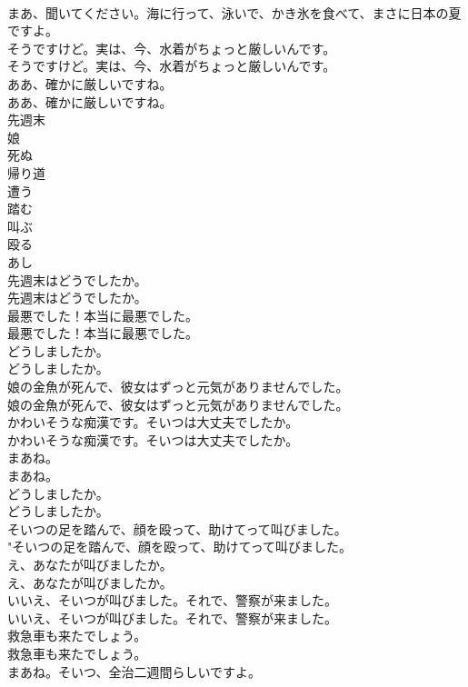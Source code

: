 \documentclass[8pt]{extreport}
\begin{document}
\begin{CJK}{UTF8}{min}
\\	まあ、聞いてください。海に行って、泳いで、かき氷を食べて、まさに日本の夏ですよ。 
\\	そうですけど。実は、今、水着がちょっと厳しいんです。	
\\	そうですけど。実は、今、水着がちょっと厳しいんです。 
\\	ああ、確かに厳しいですね。	
\\	ああ、確かに厳しいですね。 
\\	先週末
\\	娘
\\	死ぬ
\\	帰り道
\\	遭う
\\	踏む
\\	叫ぶ
\\	殴る
\\	あし
\\	先週末はどうでしたか。	
\\	先週末はどうでしたか。 
\\	最悪でした！本当に最悪でした。	
\\	最悪でした！本当に最悪でした。 
\\	どうしましたか。	
\\	どうしましたか。 
\\	娘の金魚が死んで、彼女はずっと元気がありませんでした。	
\\	娘の金魚が死んで、彼女はずっと元気がありませんでした。 
\\	かわいそうな痴漢です。そいつは大丈夫でしたか。	
\\	かわいそうな痴漢です。そいつは大丈夫でしたか。 
\\	まあね。	
\\	まあね。 
\\	どうしましたか。	
\\	どうしましたか。 
\\	そいつの足を踏んで、顔を殴って、助けてって叫びました。	
\\	"そいつの足を踏んで、顔を殴って、助けてって叫びました。 
\\	え、あなたが叫びましたか。	
\\	え、あなたが叫びましたか。 
\\	いいえ、そいつが叫びました。それで、警察が来ました。	
\\	いいえ、そいつが叫びました。それで、警察が来ました。 
\\	救急車も来たでしょう。	
\\	救急車も来たでしょう。 
\\	まあね。そいつ、全治二週間らしいですよ。	

\end{CJK}
\end{document}
